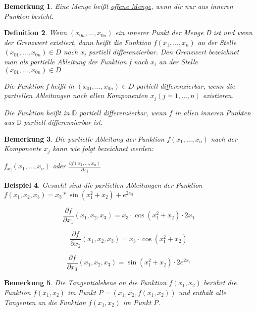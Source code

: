 \documentclass[12pt,a4paper]{scrreprt}
\newtheorem{defi}{Definition}[section]
\newtheorem{bemerkung}[defi]{Bemerkung}
\newtheorem{beispiel}[defi]{Beispiel}
\begin{document}
\begin{bemerkung}
	Eine Menge heißt \underline{offene Menge}, wenn dir nur aus inneren Punkten besteht.
\end{bemerkung}

\begin{defi}
	Wenn \((x_{0n},\dots,x_{0n})\) ein innerer Punkt der Menge D ist und wenn der Grenzwert existiert, dann heißt die Funktion \(f(x_1,\dots,x_n)\) an der Stelle \((x_{01},\dots,x_{0n})\in D\) nach \(x_i\) partiell differenzierbar. Den Grenzwert bezeichnet man als partielle Ableitung der Funktion f nach \(x_i\) an der Stelle \((x_{01},\dots,x_{0n}) \in D\)
	
	Die Funktion f heißt in \((x_{01},\dots,x_{0n}) \in D\) partiell differenzierbar, wenn die partiellen Ableitungen nach allen Komponenten \(x_j (j=1,\dots,n)\) existieren.
	
	Die Funktion heißt in $\mathbb{D}$ partiell differenzierbar, wenn $f$ in allen inneren Punkten aus $\mathbb{D}$ partiell differenzierbar ist.
\end{defi}

\begin{bemerkung}
	Die partielle Ableitung der Funktion \(f(x_1,\dots,x_n)\) nach der Komponente \(x_j\) kann wie folgt bezeichnet werden:
	
	\(f_{x_j}(x_1,\dots,x_n)\) oder \(\frac{\partial f(x_1,\dots,x_n)}{\partial x_j}\)
\end{bemerkung}
\begin{beispiel}
	Gesucht sind die partiellen Ableitungen der Funktion
	\(f(x_1,x_2,x_3)=x_3*\sin(x_1^2+x_2)+e^{2x_3}\)
	
	\[\frac{\partial f}{\partial x_1}(x_1,x_2,x_3)=x_3\cdot\cos(x_1^2+x_2)\cdot2x_1\]
	
	\[\frac{\partial f}{\partial x_2}(x_1,x_2,x_3)=x_3\cdot\cos(x_1^2+x_2)\]
		
	\[\frac{\partial f}{\partial x_3}(x_1,x_2,x_3)=\sin(x_1^2+x_2)\cdot2e^{2x_3}\]
\end{beispiel}

\begin{bemerkung}
	Die Tangentialebene an die Funktion $f(x_1,x_2)$ berührt die Funktion $f(x_1,x_2)$ im Punkt $\bar{P}=(\bar{x_1},\bar{x_2},f(\bar{x_1},\bar{x_2}))$ und enthält alle Tangenten an die Funktion $f(x_1,x_2)$ im Punkt $\bar{P}$.
\end{bemerkung}
\end{document}
